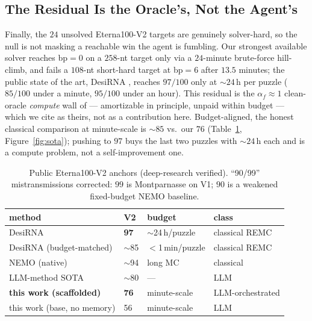 \documentclass[11pt]{article}
\newcommand{\af}{\alpha_f}
\begin{document}
\subsection{The Residual Is the Oracle's, Not the Agent's}\label{sec:residual}
Finally, the $24$ unsolved Eterna100-V2 targets are genuinely solver-hard, so the null is not masking a
reachable win the agent is fumbling. Our strongest available solver reaches bp$=0$ on a $258$-nt target
only via a $24$-minute brute-force hill-climb, and fails a $108$-nt short-hard target at bp$=6$ after
$13.5$ minutes; the public state of the art, DesiRNA \citep{wirecki2025desirna}, reaches $97/100$ only at
$\sim\!24$\,h per puzzle ($85/100$ under a minute, $95/100$ under an hour). This residual is the
$\af\!\approx\!1$ clean-oracle \emph{compute} wall of \citet{oracleresidue} --- amortizable in principle,
unpaid within budget --- which we cite as theirs, not as a contribution here. Budget-aligned, the honest
classical comparison at minute-scale is $\sim\!85$ vs.\ our $76$ (Table~\ref{tab:sota},
Figure~\ref{fig:sota}); pushing to $97$ buys the last two puzzles with $\sim\!24$\,h each and is a
compute problem, not a self-improvement one.

\begin{table}[t]\centering\small
\caption{Public Eterna100-V2 anchors (deep-research verified). ``90/99'' mistransmissions corrected:
$99$ is Montparnasse on V1; $90$ is a weakened fixed-budget NEMO baseline.}
\label{tab:sota}
\begin{tabular}{@{}llll@{}}
\toprule
method & V2 & budget & class\\
\midrule
DesiRNA \citep{wirecki2025desirna} & \textbf{97} & $\sim$24\,h/puzzle & classical REMC\\
DesiRNA (budget-matched) & $\sim$85 & $<$1\,min/puzzle & classical REMC\\
NEMO (native) & $\sim$94 & long MC & classical\\
LLM-method SOTA \citep{gautam2026rnalm} & $\sim$80 & --- & LLM\\
\textbf{this work (scaffolded)} & \textbf{76} & minute-scale & LLM-orchestrated\\
this work (base, no memory) & 56 & minute-scale & LLM\\
\bottomrule
\end{tabular}
\end{table}
\end{document}
